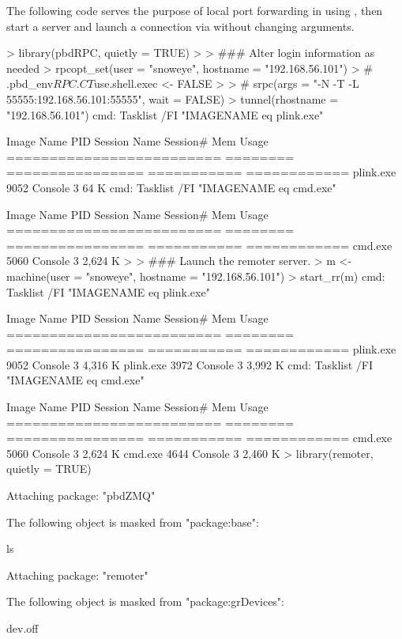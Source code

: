 The following code serves the purpose of local port forwarding in
 using , then start a  server and
launch a connection via  without changing arguments.
\begin{Code}[title=Forward \code{localhost:55555} to \code{192.168.56.101:55555}]
> library(pbdRPC, quietly = TRUE)
>
> ### Alter login information as needed
> rpcopt_set(user = "snoweye", hostname = "192.168.56.101")
> # .pbd_env$RPC.CT$use.shell.exec <- FALSE
>
> # srpc(args = "-N -T -L 55555:192.168.56.101:55555", wait = FALSE)
> tunnel(rhostname = "192.168.56.101")
cmd: Tasklist /FI "IMAGENAME eq plink.exe"

Image Name                     PID Session Name        Session#    Mem Usage
========================= ======== ================ =========== ============
plink.exe                     9052 Console                    3         64 K
cmd: Tasklist /FI "IMAGENAME eq cmd.exe"

Image Name                     PID Session Name        Session#    Mem Usage
========================= ======== ================ =========== ============
cmd.exe                       5060 Console                    3      2,624 K
>
> ### Launch the remoter server.
> m <- machine(user = "snoweye", hostname = "192.168.56.101")
> start_rr(m)
cmd: Tasklist /FI "IMAGENAME eq plink.exe"

Image Name                     PID Session Name        Session#    Mem Usage
========================= ======== ================ =========== ============
plink.exe                     9052 Console                    3      4,316 K
plink.exe                     3972 Console                    3      3,992 K
cmd: Tasklist /FI "IMAGENAME eq cmd.exe"

Image Name                     PID Session Name        Session#    Mem Usage
========================= ======== ================ =========== ============
cmd.exe                       5060 Console                    3      2,624 K
cmd.exe                       4644 Console                    3      2,460 K
> library(remoter, quietly = TRUE)

Attaching package: "pbdZMQ"

The following object is masked from "package:base":

    ls


Attaching package: "remoter"

The following object is masked from "package:grDevices":

    dev.off


\end{Code}
